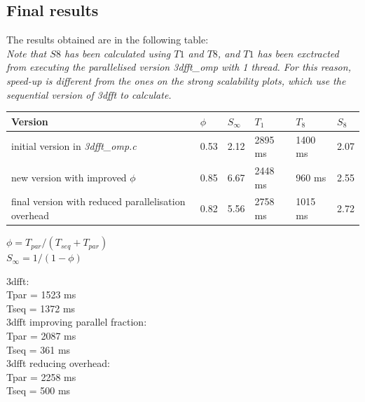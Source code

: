 \documentclass[12]{article}
\begin{document}
\subsection{Final results}

The results obtained are in the following table: \\
\textit{Note that $S{8}$ has been calculated using $T1$ and $T8$, and $T1$ has been exctracted from executing the parallelised version 3dfft\_omp with 1 thread. For this reason, speed-up is different from the ones on the strong scalability plots, which use the sequential version of 3dfft to calculate.}

\bigskip

\begin{table}[H]
\begin{tabular}{|l|l|l|l|l|l|}
\hline \textbf{Version} & $\phi $ & $S_\infty$ & $T_1$ & $T_8$ & $S_8$ \\ \hline
initial version in \textit{3dfft\_omp.c} & 0.53 & 2.12 & 2895 ms & 1400 ms & 2.07 \\ \hline
new version with improved $\phi$ & 0.85 & 6.67 & 2448 ms & 960 ms & 2.55 \\ \hline
final version with reduced parallelisation overhead & 0.82 & 5.56 & 2758 ms & 1015 ms & 2.72 \\ \hline

\end{tabular}
\end{table}

\bigskip

\begin{center}
$\phi = T_{par} / (T_{seq} + T_{par}) $ \\
$S_\infty = 1 / (1 - \phi) $
\end{center}

\bigskip

3dfft: \\
Tpar = 1523 ms \\
Tseq = 1372 ms \\

3dfft improving parallel fraction: \\
Tpar = 2087 ms \\
Tseq = 361 ms \\

3dfft reducing overhead: \\
Tpar = 2258 ms \\
Tseq = 500 ms \\
\end{document}
